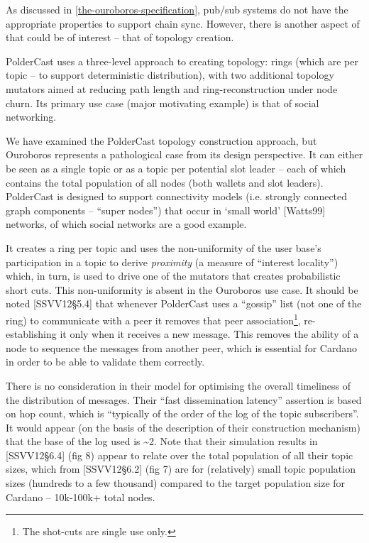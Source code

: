 \documentclass[11pt,a4paper]{article}
\begin{document}
As discussed in \cref{the-ouroboros-specification}, pub/sub systems
do not have the appropriate properties to support chain sync. However,
there is another aspect of that could be of interest -- that of topology
creation.

PolderCast uses a three-level approach to creating topology: rings
(which are per topic -- to support deterministic distribution), with two
additional topology mutators aimed at reducing path length and
ring-reconstruction under node churn. Its primary use case (major
motivating example) is that of social networking.

We have examined the PolderCast topology construction approach, but
Ouroboros represents a pathological case from its design perspective. It
can either be seen as a single topic or as a topic per potential slot
leader -- each of which contains the total population of all nodes (both
wallets and slot leaders). PolderCast is designed to support
connectivity models (i.e. strongly connected graph components -- ``super
nodes'') that occur in `small world' {[}Watts99{]} networks, of which
social networks are a good example.

It creates a ring per topic and uses the non-uniformity of the user
base's participation in a topic to derive \emph{proximity} (a measure of
``interest locality'') which, in turn, is used to drive one of the
mutators that creates probabilistic short cuts. This non-uniformity is
absent in the Ouroboros use case. It should be noted {[}SSVV12§5.4{]}
that whenever PolderCast uses a ``gossip'' list (not one of the ring) to
communicate with a peer it removes that peer association\footnote{The
  shot-cuts are single use only.}, re-establishing it only when it
receives a new message. This removes the ability of a node to sequence
the messages from another peer, which is essential for Cardano in order
to be able to validate them correctly.

There is no consideration in their model for optimising the overall
timeliness of the distribution of messages. Their ``fast dissemination
latency'' assertion is based on hop count, which is ``typically of the
order of the log of the topic subscribers''. It would appear (on the
basis of the description of their construction mechanism) that the base
of the log used is \textasciitilde{}2. Note that their simulation
results in {[}SSVV12§6.4{]} (fig 8) appear to relate over the total
population of all their topic sizes, which from {[}SSVV12§6.2{]} (fig 7)
are for (relatively) small topic population sizes (hundreds to a few
thousand) compared to the target population size for Cardano --
10k-100k+ total nodes.
\end{document}
